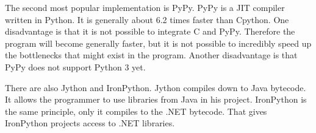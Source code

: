 The second most popular implementation is PyPy. PyPy is a JIT compiler written in Python. It is generally about 6.2 times faster than Cpython. One disadvantage is that it is not possible to integrate C and PyPy. Therefore the program will become generally faster, but it is not possible to incredibly speed up the bottlenecks that might exist in the program. Another disadvantage is that PyPy does not support Python 3 yet.

There are also Jython and IronPython. Jython compiles down to Java bytecode. It allows the programmer to use libraries from Java in his project. IronPython is the same principle, only it compiles to the .NET bytecode. That gives IronPython projects access to .NET libraries. 
